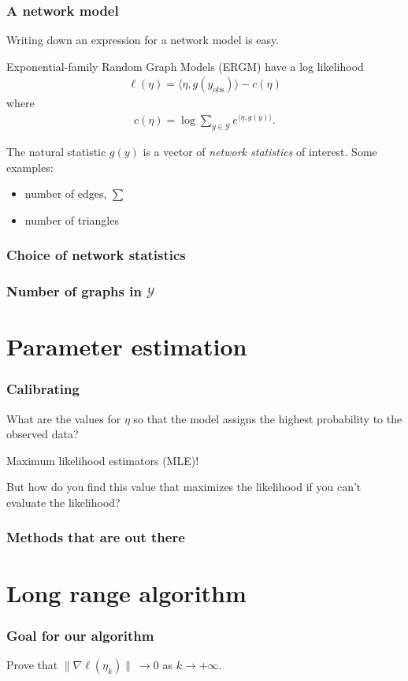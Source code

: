 \documentclass[compress, 9pt]{beamer}
\def\YY{{\mathcal Y}}
\newcommand{\inner}[1]{\langle #1 \rangle}
\newcommand{\yobs}{y_{\text{obs}}}
\begin{document}
\frame
{
\frametitle{A network model}

Writing down an expression for a network model is easy.  

Exponential-family Random Graph Models (ERGM) have a log likelihood
\begin{align*}
	\ell( \eta) = \inner{\eta, g(\yobs)} - c(\eta)
\end{align*}
where
\begin{align*}
	c(\eta) = \log \sum_{y \in \YY} e^{\inner{\eta, g(y)}}.
\end{align*}

The natural statistic $g(y)$ is a vector of \emph{network statistics} of interest.  Some examples:
\begin{itemize}
	\item number of edges, $\sum$
	\item number of triangles
\end{itemize}


}

\frame
{
\frametitle{Choice of network statistics}

}
\frame
{
\frametitle{Number of graphs in $\YY$}

}

\section{Parameter estimation}
\frame
{
\frametitle{Calibrating}
What are the values for $\eta$ so that the model assigns the highest probability to the observed data?

Maximum likelihood estimators (MLE)!

But how do you find this value that maximizes the likelihood if you can't evaluate the likelihood?
}

\frame
{
\frametitle{Methods that are out there}
\begin{figure}
\begin{center} 
\end{center} 
\label{fmh} 
\end{figure}
}

\section{Long range algorithm}
\frame
{
\frametitle{Goal for our algorithm}
Prove that $\lVert \nabla \ell(\eta_k) \rVert \ \to 0$ as $k \to +\infty$.
}
\end{document}

